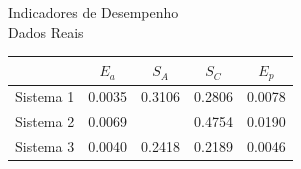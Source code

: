 \documentclass{beamer}
\begin{document}
\begin{frame}{Indicadores de Desempenho\\Dados Reais}

\begin{table}[bt]
    \centering
    \begin{tabular}{lcccc}
        \toprule
        & $E_a$ & $S_A$ & $S_C$ & $E_p$ \\
        \midrule
        Sistema 1 & 0.0035 & 0.3106 & 0.2806 & 0.0078 \\
        Sistema 2 & 0.0069 &  & 0.4754 & 0.0190 \\
        Sistema 3 & 0.0040 & 0.2418 & 0.2189 & 0.0046 \\
        \bottomrule
    \end{tabular}
\end{table}
\end{frame}
\end{document}
